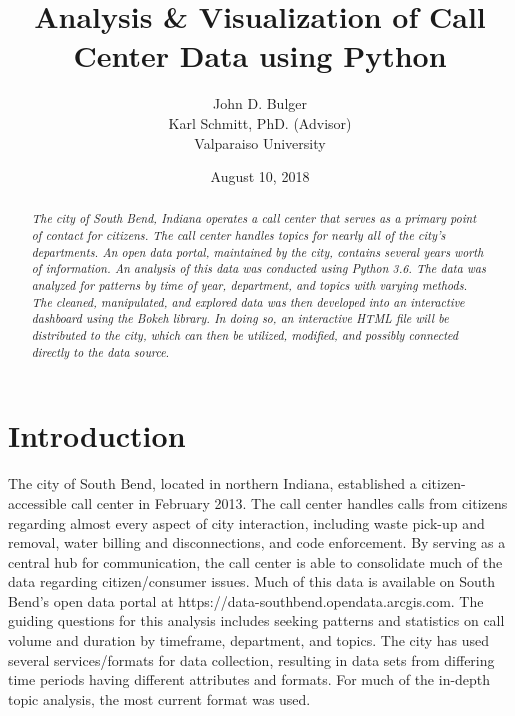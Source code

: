 \documentclass[11pt,twocolumn]{article}
\title{Analysis \& Visualization of Call Center Data using Python}
\author{John D. Bulger
\\
Karl Schmitt, PhD. (Advisor)
\\
Valparaiso University\\
}
\date{August 10, 2018}
\begin{document}
\maketitle

\begin{abstract}
\textit{The city of South Bend, Indiana operates a call center that serves as a primary point of contact for citizens.  The call center handles topics for nearly all of the city's departments.  An open data portal, maintained by the city, contains several years worth of information.  An analysis of this data was conducted using Python 3.6.  The data was 
analyzed for patterns by time of year, department, and topics with varying methods.  The cleaned, manipulated, and explored data was then developed into an 
interactive dashboard using the Bokeh library.  In doing so, an interactive HTML file will be distributed to the city, which can then be utilized, modified, and possibly connected 
directly to the data source}.
\end{abstract}

\section{Introduction}
The city of South Bend, located in northern Indiana, established a citizen-accessible call center in February 2013.  The call center handles calls from citizens regarding almost every aspect of city interaction, including waste pick-up and removal, water billing and disconnections, 
and code enforcement.  By serving as a central hub for communication, the call center is able to consolidate much of the data regarding citizen/consumer issues.  
Much of this data is available on South Bend's open data portal at https://data-southbend.opendata.arcgis.com.  The guiding questions for this analysis includes seeking patterns and statistics on call volume and duration by timeframe, department, and topics.  The city has used several services/formats for data collection, resulting in data sets from differing time periods having different attributes and formats.  For much of the in-depth topic analysis, the most current format was used.
\end{document}
